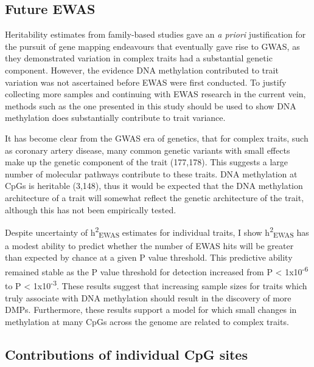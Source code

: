 \documentclass[11pt,oneside]{bristolthesis}
\begin{document}
\hypertarget{future-ewas-05}{%
\subsection{Future EWAS}\label{future-ewas-05}}

Heritability estimates from family-based studies gave an \emph{a priori} justification for the pursuit of gene mapping endeavours that eventually gave rise to GWAS, as they demonstrated variation in complex traits had a substantial genetic component. However, the evidence DNA methylation contributed to trait variation was not ascertained before EWAS were first conducted. To justify collecting more samples and continuing with EWAS research in the current vein, methods such as the one presented in this study should be used to show DNA methylation does substantially contribute to trait variance.

It has become clear from the GWAS era of genetics, that for complex traits, such as coronary artery disease, many common genetic variants with small effects make up the genetic component of the trait (177,178). This suggests a large number of molecular pathways contribute to these traits. DNA methylation at CpGs is heritable (3,148), thus it would be expected that the DNA methylation architecture of a trait will somewhat reflect the genetic architecture of the trait, although this has not been empirically tested.

Despite uncertainty of h\textsuperscript{2}\textsubscript{EWAS} estimates for individual traits, I show h\textsuperscript{2}\textsubscript{EWAS} has a modest ability to predict whether the number of EWAS hits will be greater than expected by chance at a given P value threshold. This predictive ability remained stable as the P value threshold for detection increased from P \textless{} 1x10\textsuperscript{-6} to P \textless{} 1x10\textsuperscript{-3}. These results suggest that increasing sample sizes for traits which truly associate with DNA methylation should result in the discovery of more DMPs. Furthermore, these results support a model for which small changes in methylation at many CpGs across the genome are related to complex traits.

\hypertarget{contribution-of-individual-cpg-sites}{%
\subsection{Contributions of individual CpG sites}\label{contribution-of-individual-cpg-sites}}
\end{document}

